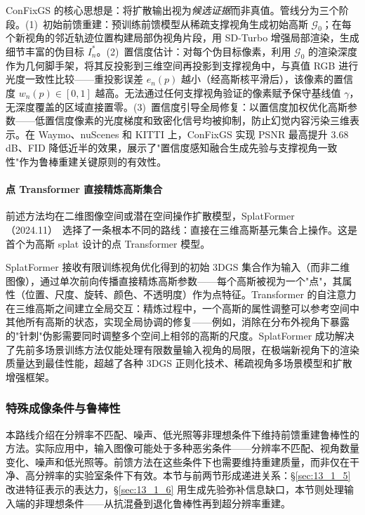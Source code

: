 ConFixGS 的核心思想是：将扩散输出视为\emph{候选证据}而非真值。管线分为三个阶段。(1)~初始前馈重建：预训练前馈模型从稀疏支撑视角生成初始高斯 $\mathcal{G}_0$；在每个新视角的邻近轨迹位置构建局部伪视角片段，用 SD-Turbo 增强局部渲染，生成细节丰富的伪目标 $I_n^*$。(2)~置信度估计：对每个伪目标像素，利用 $\mathcal{G}_0$ 的渲染深度作为几何脚手架，将其反投影到三维空间再投影到支撑视角中，与真值 RGB 进行光度一致性比较——重投影误差 $e_n(p)$ 越小（经高斯核平滑后），该像素的置信度 $w_n(p) \in [0,1]$ 越高。无法通过任何支撑视角验证的像素赋予保守基线值 $\gamma$，无深度覆盖的区域直接置零。(3)~置信度引导全局修复：以置信度加权优化高斯参数——低置信度像素的光度梯度和致密化信号均被抑制，防止幻觉内容污染三维表示。在 Waymo、nuScenes 和 KITTI 上，ConFixGS 实现 PSNR 最高提升 3.68 dB、FID 降低近半的效果，展示了"置信度感知融合生成先验与支撑视角一致性"作为鲁棒重建关键原则的有效性。

\paragraph{点 Transformer 直接精炼高斯集合}

前述方法均在二维图像空间或潜在空间操作扩散模型，SplatFormer（2024.11）~\cite{2411_06390}选择了一条根本不同的路线：直接在三维高斯基元集合上操作。这是首个为高斯 splat 设计的点 Transformer 模型。

SplatFormer 接收有限训练视角优化得到的初始 3DGS 集合作为输入（而非二维图像），通过单次前向传播直接精炼高斯参数——每个高斯被视为一个"点"，其属性（位置、尺度、旋转、颜色、不透明度）作为点特征。Transformer 的自注意力在三维高斯之间建立全局交互：精炼过程中，一个高斯的属性调整可以参考空间中其他所有高斯的状态，实现全局协调的修复——例如，消除在分布外视角下暴露的"针刺"伪影需要同时调整多个空间上相邻的高斯的尺度。SplatFormer 成功解决了先前多场景训练方法仅能处理有限数量输入视角的局限，在极端新视角下的渲染质量达到最佳性能，超越了各种 3DGS 正则化技术、稀疏视角多场景模型和扩散增强框架。

\subsubsection{特殊成像条件与鲁棒性}
\label{sec:13_1_7}

本路线介绍在分辨率不匹配、噪声、低光照等非理想条件下维持前馈重建鲁棒性的方法。实际应用中，输入图像可能处于多种恶劣条件——分辨率不匹配、视角数量变化、噪声和低光照等。前馈方法在这些条件下也需要维持重建质量，而非仅在干净、高分辨率的实验室条件下有效。本节与前两节形成递进关系：\S\ref{sec:13_1_5} 改进特征表示的表达力，\S\ref{sec:13_1_6} 用生成先验弥补信息缺口，本节则处理输入端的非理想条件——从抗混叠到退化鲁棒性再到超分辨率重建。

